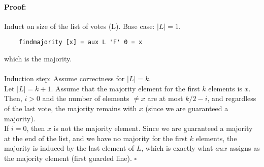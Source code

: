 \documentclass[a4paper]{article}
\newenvironment{proof}{\paragraph{Proof:}}{\hfill$\square$}
\begin{document}
\begin{proof}
	Induct on size of the list of votes (L).
	Base case: $|L|=1$. 
	\begin{verbatim}
	findmajority [x] = aux L 'F' 0 = x  
	\end{verbatim} 
	which is the majority.	
	\\ \\
	Induction step: Assume correctness for $|L|=k$. \\
	Let $|L|=k+1$. Assume that the majority element for the first $k$ elements is $x$. Then, $i>0$ and the number of elements $ \neq x$ are at most $k/2-i$, and regardless of the last vote, the majority remains with $x$ (since we are guaranteed a majority). \\
	If $i=0$, then $x$ is not the majority element. Since we are guaranteed a majority at the end of the list, and we have no majority for the first $k$ elements, the majority is induced by the last element of $L$, which is exactly what $aux$ assigns as the majority element (first guarded line).  
	\end{proof}
	
\end{document}

